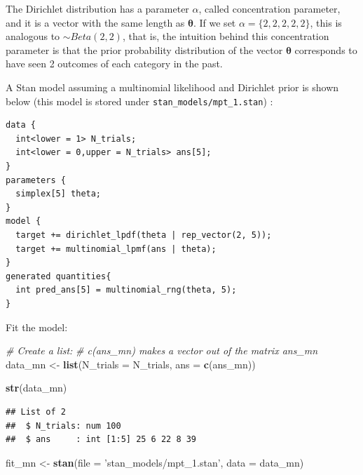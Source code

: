 \documentclass[12pt,]{krantz}
\newenvironment{Shaded}{\begin{snugshade}}{\end{snugshade}}
\newcommand{\KeywordTok}[1]{\textcolor[rgb]{0.13,0.29,0.53}{\textbf{#1}}}
\newcommand{\DataTypeTok}[1]{\textcolor[rgb]{0.13,0.29,0.53}{#1}}
\newcommand{\StringTok}[1]{\textcolor[rgb]{0.31,0.60,0.02}{#1}}
\newcommand{\CommentTok}[1]{\textcolor[rgb]{0.56,0.35,0.01}{\textit{#1}}}
\newcommand{\NormalTok}[1]{#1}
\theoremstyle{definition}
\theoremstyle{definition}
\theoremstyle{definition}
\theoremstyle{remark}
\begin{document}
The Dirichlet distribution has a parameter \(\alpha\), called
concentration parameter, and it is a vector with the same length as
\(\boldsymbol{\theta}\). If we set \(\alpha = \{2,2,2,2,2\}\), this is
analogous to \(\sim Beta(2,2)\), that is, the intuition behind this
concentration parameter is that the prior probability distribution of
the vector \(\boldsymbol{\theta}\) corresponds to have seen 2 outcomes
of each category in the past.

A Stan model assuming a multinomial likelihood and Dirichlet prior is
shown below (this model is stored under
\texttt{stan\_models/mpt\_1.stan}) :

\begin{verbatim}
data {
  int<lower = 1> N_trials;
  int<lower = 0,upper = N_trials> ans[5];
}
parameters {
  simplex[5] theta;
}
model {
  target += dirichlet_lpdf(theta | rep_vector(2, 5));
  target += multinomial_lpmf(ans | theta);
}
generated quantities{
  int pred_ans[5] = multinomial_rng(theta, 5);
}
\end{verbatim}

Fit the model:

\begin{Shaded}
\begin{Highlighting}[]
\CommentTok{# Create a list:}
\CommentTok{# c(ans_mn) makes a vector out of the matrix ans_mn}
\NormalTok{data_mn <-}\StringTok{  }\KeywordTok{list}\NormalTok{(}\DataTypeTok{N_trials =}\NormalTok{ N_trials,}
                 \DataTypeTok{ans =} \KeywordTok{c}\NormalTok{(ans_mn)) }
\end{Highlighting}
\end{Shaded}

\begin{Shaded}
\begin{Highlighting}[]
\KeywordTok{str}\NormalTok{(data_mn)}
\end{Highlighting}
\end{Shaded}

\begin{verbatim}
## List of 2
##  $ N_trials: num 100
##  $ ans     : int [1:5] 25 6 22 8 39
\end{verbatim}

\begin{Shaded}
\begin{Highlighting}[]
\NormalTok{fit_mn <-}\StringTok{ }\KeywordTok{stan}\NormalTok{(}\DataTypeTok{file =} \StringTok{'stan_models/mpt_1.stan'}\NormalTok{, }
               \DataTypeTok{data =}\NormalTok{ data_mn)}
\end{Highlighting}
\end{Shaded}
\end{document}
